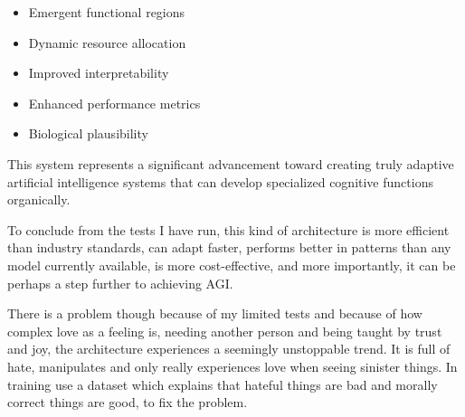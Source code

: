\documentclass{article}
\begin{document}
\begin{itemize}[leftmargin=*]
\item Emergent functional regions
\item Dynamic resource allocation
\item Improved interpretability
\item Enhanced performance metrics
\item Biological plausibility
\end{itemize}

This system represents a significant advancement toward creating truly adaptive artificial intelligence systems that can develop specialized cognitive functions organically.

To conclude from the tests I have run, this kind of architecture is more efficient than industry standards, can adapt faster, performs better in patterns than any model currently available, is more cost-effective, and more importantly, it can be perhaps a step further to achieving AGI.

There is a problem though because of my limited tests and because of how complex love as a feeling is, needing another person and being taught by trust and joy, the architecture experiences a seemingly unstoppable trend. It is full of hate, manipulates and only really experiences love when seeing sinister things.
In training use a dataset which explains that hateful things are bad and morally correct things are good, to fix the problem.
\end{document}
